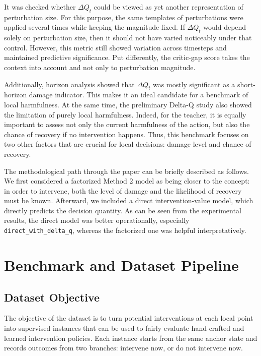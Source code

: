 \documentclass[11pt]{article}
\begin{document}
It was checked whether \(\Delta Q_t\) could be viewed as yet another representation of perturbation size. For this purpose, the same templates of perturbations were applied several times while keeping the magnitude fixed. If \(\Delta Q_t\) would depend solely on perturbation size, then it should not have varied noticeably under that control. However, this metric still showed variation across timesteps and maintained predictive significance. Put differently, the critic-gap score takes the context into account and not only to perturbation magnitude.

Additionally, horizon analysis showed that \(\Delta Q_t\) was mostly significant as a short-horizon damage indicator. This makes it an ideal candidate for a benchmark of local harmfulness. At the same time, the preliminary Delta-Q study also showed the limitation of purely local harmfulness. Indeed, for the teacher, it is equally important to assess not only the current harmfulness of the action, but also the chance of recovery if no intervention happens. Thus, this benchmark focuses on two other factors that are crucial for local decisions: damage level and chance of recovery.

The methodological path through the paper can be briefly described as follows. We first considered a factorized Method 2 model as being closer to the concept: in order to intervene, both the level of damage and the likelihood of recovery must be known. Afterward, we included a direct intervention-value model, which directly predicts the decision quantity. As can be seen from the experimental results, the direct model was better operationally, especially \texttt{direct\_with\_delta\_q}, whereas the factorized one was helpful interpretatively.

\section{Benchmark and Dataset Pipeline}

\subsection*{Dataset Objective}

The objective of the dataset is to turn potential interventions at each local point into supervised instances that can be used to fairly evaluate hand-crafted and learned intervention policies. Each instance starts from the same anchor state and records outcomes from two branches: intervene now, or do not intervene now.
\end{document}
